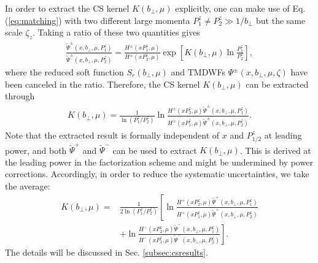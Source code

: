 In order to extract the CS kernel $K\left(b_{\perp}, \mu\right)$ explicitly, one  can make use of    Eq.(\ref{eq:matching}) with  two different large momenta $P_1^z\neq P_2^z\gg1/b_{\perp}$ but the same   scale $\zeta_z$. Taking a  ratio of these two quantities  gives 
\begin{align}
	\frac{\tilde \Psi^{\pm}(x, b_{\perp}, \mu,P_1^z)}{\tilde \Psi^{\pm}(x, b_{\perp}, \mu, P_2^z)}=\frac{H^{\pm}\left(xP_1^z,\mu \right)}{H^{\pm}\left(xP_2^z,\mu \right)}\exp\left[K(b_{\perp},\mu) \ln\frac{P_1^z}{P_2^z}\right], \label{eq:ratioofquasiWF}
\end{align}
where the reduced soft function $S_r(b_{\perp},\mu)$ and TMDWFs $\Psi^{\pm}(x,b_{\perp},\mu,\zeta)$  have been canceled in the ratio. Therefore, the CS kernel $K\left(b_{\perp}, \mu\right)$ can be extracted through 
\begin{align}
	K\left(b_{\perp}, \mu\right)=\frac{1}{\ln(P_1^z/P_2^z)} \ln\frac{H^{\pm}(xP_2^z,\mu)\tilde{\Psi}^{\pm}(x,b_{\perp},\mu,P_1^z)}{H^{\pm}(xP_1^z,\mu)\tilde{\Psi}^{\pm}(x,b_{\perp},\mu,P_2^z)}. \label{eq:extractingCSkernel}
\end{align}
Note that the extracted result is formally independent of $x$ and $P_{1/2}^z$ at leading power,  and both $\tilde{\Psi}^{+}$ and $\tilde{\Psi}^{-}$ can be used to extract $K\left(b_{\perp}, \mu\right)$.  This is derived at the leading power in the factorization scheme and  might be undermined by power corrections. Accordingly, in order  to reduce  the systematic uncertainties,  we take the average: 
 \begin{align}
	K\left(b_{\perp}, \mu\right)=&\frac{1}{2\ln(P_1^z/P_2^z)} \left[\ln\frac{H^{+}(xP_2^z,\mu)\tilde{\Psi}^{+}(x,b_{\perp},\mu,P_1^z)}{H^{+}(xP_1^z,\mu)\tilde{\Psi}^{+}(x,b_{\perp},\mu,P_2^z)}\right.  \nonumber\\
	&+\left.\ln\frac{H^{-}(xP_2^z,\mu)\tilde{\Psi}^{-}(x,b_{\perp},\mu,P_1^z)}{H^{-}(xP_1^z,\mu)\tilde{\Psi}^{-}(x,b_{\perp},\mu,P_2^z)}\right].
\end{align}
The details will be discussed in Sec. \ref{subsec:csresults}.
